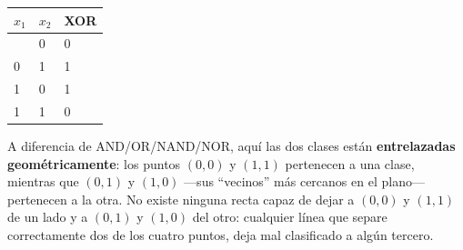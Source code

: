 \documentclass[
  letterpaper,
  DIV=11,
  numbers=noendperiod]{scrartcl}
\newcounter{none} %
\begin{document}
{\def\LTcaptype{none} %
\begin{longtable}[]{@{}lll@{}}
\toprule\noalign{}
\(x_1\) & \(x_2\) & XOR \\
\midrule\noalign{}
\endhead
\bottomrule\noalign{}
\endlastfoot
0 & 0 & 0 \\
0 & 1 & 1 \\
1 & 0 & 1 \\
1 & 1 & 0 \\
\end{longtable}
}

A diferencia de AND/OR/NAND/NOR, aquí las dos clases están
\textbf{entrelazadas geométricamente}: los puntos \((0,0)\) y \((1,1)\)
pertenecen a una clase, mientras que \((0,1)\) y \((1,0)\) ---sus
``vecinos'' más cercanos en el plano--- pertenecen a la otra. No existe
ninguna recta capaz de dejar a \((0,0)\) y \((1,1)\) de un lado y a
\((0,1)\) y \((1,0)\) del otro: cualquier línea que separe correctamente
dos de los cuatro puntos, deja mal clasificado a algún tercero.
\end{document}
